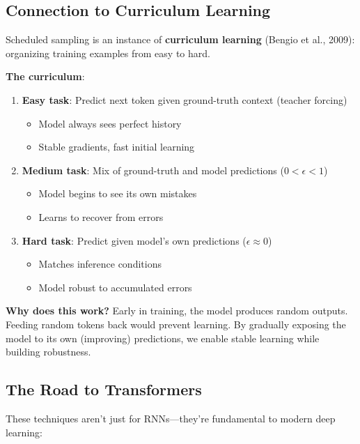 \documentclass{article}
\begin{document}
\subsection{Connection to Curriculum Learning}

Scheduled sampling is an instance of \textbf{curriculum learning} (Bengio et al., 2009): organizing training examples from easy to hard.

\textbf{The curriculum}:
\begin{enumerate}
\item \textbf{Easy task}: Predict next token given ground-truth context (teacher forcing)
\begin{itemize}
\item Model always sees perfect history
\item Stable gradients, fast initial learning
\end{itemize}
\item \textbf{Medium task}: Mix of ground-truth and model predictions ($0 < \epsilon < 1$)
\begin{itemize}
\item Model begins to see its own mistakes
\item Learns to recover from errors
\end{itemize}
\item \textbf{Hard task}: Predict given model's own predictions ($\epsilon \approx 0$)
\begin{itemize}
\item Matches inference conditions
\item Model robust to accumulated errors
\end{itemize}
\end{enumerate}

\textbf{Why does this work?} Early in training, the model produces random outputs. Feeding random tokens back would prevent learning. By gradually exposing the model to its own (improving) predictions, we enable stable learning while building robustness.

\subsection{The Road to Transformers}

These techniques aren't just for RNNs—they're fundamental to modern deep learning:
\end{document}
